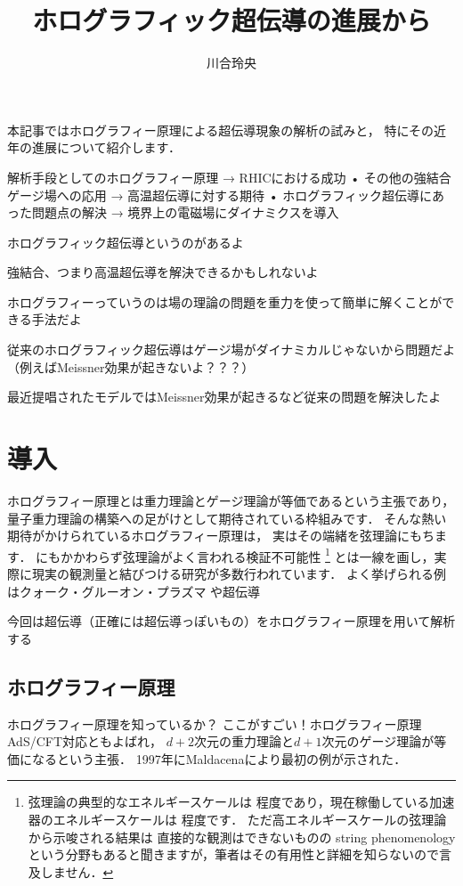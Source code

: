 \documentclass[b5paper,11pt,dvipdfmx]{jsarticle}
\numberwithin{equation}{section}
\theoremstyle{definition}
\begin{document}
\title{ホログラフィック超伝導の進展から}
\author{川合玲央}

\maketitle


本記事ではホログラフィー原理による超伝導現象の解析の試みと，
特にその近年の進展について紹介します．




解析手段としてのホログラフィー原理
→ RHICにおける成功
• その他の強結合ゲージ場への応用
→ 高温超伝導に対する期待
• ホログラフィック超伝導にあった問題点の解決
→ 境界上の電磁場にダイナミクスを導入



ホログラフィック超伝導というのがあるよ

強結合、つまり高温超伝導を解決できるかもしれないよ

ホログラフィーっていうのは場の理論の問題を重力を使って簡単に解くことができる手法だよ

従来のホログラフィック超伝導はゲージ場がダイナミカルじゃないから問題だよ
（例えばMeissner効果が起きないよ？？？）

最近提唱されたモデルではMeissner効果が起きるなど従来の問題を解決したよ

\section{導入}
ホログラフィー原理とは重力理論とゲージ理論が等価であるという主張であり，
量子重力理論の構築への足がけとして期待されている枠組みです．
そんな熱い期待がかけられているホログラフィー原理は，
実はその端緒を弦理論にもちます．
にもかかわらず弦理論がよく言われる検証不可能性
\footnote{弦理論の典型的なエネルギースケールは
程度であり，現在稼働している加速器のエネルギースケールは
程度です．
ただ高エネルギースケールの弦理論から示唆される結果は
直接的な観測はできないものの
string phenomenologyという分野もあると聞きますが，筆者はその有用性と詳細を知らないので言及しません．}
とは一線を画し，実際に現実の観測量と結びつける研究が多数行われています．
よく挙げられる例はクォーク・グルーオン・プラズマ\cite{Policastro01,Kovtun04}
や超伝導\cite{Hartnoll08a,Hartnoll08b}

今回は超伝導（正確には超伝導っぽいもの）をホログラフィー原理を用いて解析する

\subsection{ホログラフィー原理}
ホログラフィー原理を知っているか？
ここがすごい！ホログラフィー原理
AdS/CFT対応ともよばれ，
$d + 2$次元の重力理論と$d + 1$次元のゲージ理論が等価になるという主張．
1997年にMaldacenaにより最初の例が示された\cite{Maldacena97}．
\end{document}
